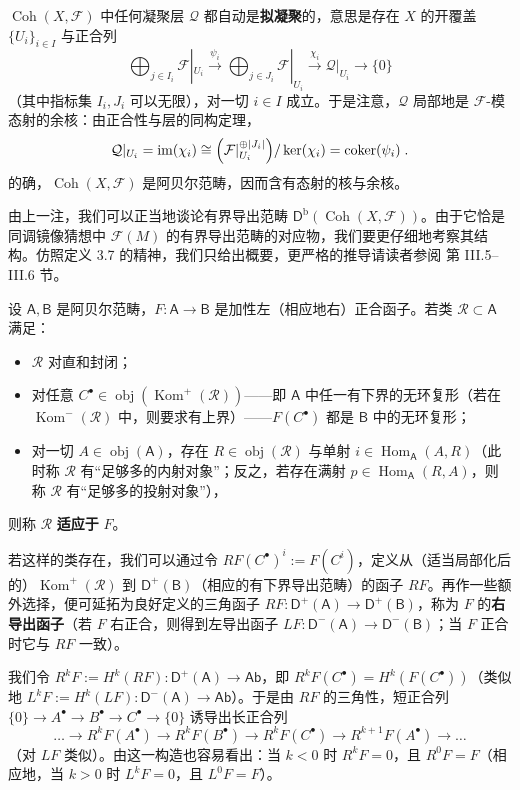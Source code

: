 \begin{Rem}\label{rem:7.18}
$\operatorname{Coh}(X,\mathcal F)$ 中任何凝聚层 $\mathcal Q$ 都自动是\textbf{拟凝聚}的，意思是存在 $X$ 的开覆盖 $\{U_i\}_{i\in I}$ 与正合列
\[
\bigoplus_{j\in I_i}\mathcal F|_{U_i}\xrightarrow{\ \psi_i\ }\bigoplus_{j\in J_i}\mathcal F|_{U_i}\xrightarrow{\ \chi_i\ }\mathcal Q|_{U_i}\to\{0\}
\]
（其中指标集 $I_i,J_i$ 可以无限），对一切 $i\in I$ 成立。于是注意，$\mathcal Q$ 局部地是 $\mathcal F$-模态射的余核：由正合性与层的同构定理，
\[
\mathcal Q|_{U_i}=\operatorname{im}(\chi_i)\cong\Bigl(\mathcal F|_{U_i}^{\oplus|J_i|}\Bigr)/\ker(\chi_i)=\operatorname{coker}(\psi_i)\;.
\]
的确，$\operatorname{Coh}(X,\mathcal F)$ 是阿贝尔范畴，因而含有态射的核与余核。
\end{Rem}

由上一注，我们可以正当地谈论有界导出范畴 $\mathsf D^{\mathrm b}(\operatorname{Coh}(X,\mathcal F))$。由于它恰是同调镜像猜想中 $\mathcal F(M)$ 的有界导出范畴的对应物，我们要更仔细地考察其结构。仿照定义 3.7 的精神，我们只给出概要，更严格的推导请读者参阅 \cite{GM03} 第 III.5–III.6 节。

\begin{Def}\label{def:7.19}
设 $\mathsf A,\mathsf B$ 是阿贝尔范畴，$F:\mathsf A\to\mathsf B$ 是加性左（相应地右）正合函子。若类 $\mathcal R\subset\mathsf A$ 满足：
\begin{itemize}
  \item $\mathcal R$ 对直和封闭；
  \item 对任意 $C^\bullet\in\operatorname{obj}(\operatorname{Kom}^+(\mathcal R))$——即 $\mathsf A$ 中任一有下界的无环复形（若在 $\operatorname{Kom}^-(\mathcal R)$ 中，则要求有上界）——$F(C^\bullet)$ 都是 $\mathsf B$ 中的无环复形；
  \item 对一切 $A\in\operatorname{obj}(\mathsf A)$，存在 $R\in\operatorname{obj}(\mathcal R)$ 与单射 $i\in\operatorname{Hom}_{\mathsf A}(A,R)$（此时称 $\mathcal R$ 有“足够多的内射对象”；反之，若存在满射 $p\in\operatorname{Hom}_{\mathsf A}(R,A)$，则称 $\mathcal R$ 有“足够多的投射对象”），
\end{itemize}
则称 $\mathcal R$ \textbf{适应于} $F$。

若这样的类存在，我们可以通过令 $RF(C^\bullet)^i:=F(C^i)$，定义从（适当局部化后的）$\operatorname{Kom}^+(\mathcal R)$ 到 $\mathsf D^+(\mathsf B)$（相应的有下界导出范畴）的函子 $RF$。再作一些额外选择，便可延拓为良好定义的三角函子 $RF:\mathsf D^+(\mathsf A)\to\mathsf D^+(\mathsf B)$，称为 $F$ 的\textbf{右导出函子}（若 $F$ 右正合，则得到左导出函子 $LF:\mathsf D^-(\mathsf A)\to\mathsf D^-(\mathsf B)$；当 $F$ 正合时它与 $RF$ 一致）。

我们令 $R^kF:=H^k(RF):\mathsf D^+(\mathsf A)\to\mathsf{Ab}$，即 $R^kF(C^\bullet)=H^k(F(C^\bullet))$（类似地 $L^kF:=H^k(LF):\mathsf D^-(\mathsf A)\to\mathsf{Ab}$）。于是由 $RF$ 的三角性，短正合列 $\{0\}\to A^\bullet\to B^\bullet\to C^\bullet\to\{0\}$ 诱导出长正合列
\[
\dots\to R^kF(A^\bullet)\to R^kF(B^\bullet)\to R^kF(C^\bullet)\to R^{k+1}F(A^\bullet)\to\dots
\]
（对 $LF$ 类似）。由这一构造也容易看出：当 $k<0$ 时 $R^kF=0$，且 $R^0F=F$（相应地，当 $k>0$ 时 $L^kF=0$，且 $L^0F=F$）。
\end{Def}

